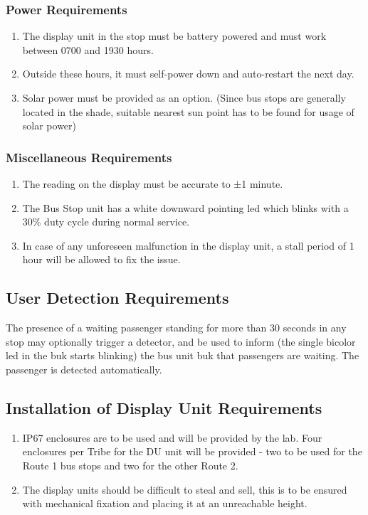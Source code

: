 \documentclass[12pt]{article} %
\begin{document}
    \subsubsection{Power Requirements}
    \begin{enumerate}
        \item The display unit in the stop must be battery powered and must work between 0700 and 1930 hours. 
        \item Outside these hours, it must self-power down and auto-restart the next day. 
        \item Solar power must be provided as an option. (Since bus stops are generally located in the shade, suitable nearest sun point has to be found for usage of solar power)
    \end{enumerate}
    \subsubsection{Miscellaneous Requirements}
    \begin{enumerate}
        \item The reading on the display must be accurate to ±1 minute. 
        \item The Bus Stop unit has a white downward pointing \acrshort{led} which blinks with a 30\% duty cycle during normal service. 
        \item In case of any unforeseen malfunction in the display unit, a stall period of 1 hour will be allowed to fix the issue. 
    \end{enumerate}
    
\subsection{User Detection Requirements}
        The presence of a waiting passenger standing for more than 30 seconds in any stop may optionally trigger a detector, and be used to inform (the single bicolor \acrshort{led} in the {\acrshort{buk}} starts blinking) the bus unit \acrshort{buk} that passengers are waiting. The passenger is detected automatically. 
        
\subsection{Installation of Display Unit Requirements}
\begin{enumerate}
    \item \gls{IP67} enclosures are to be used and will be provided by the lab. Four enclosures per Tribe for the DU unit will be provided - two to be used for the Route 1 bus stops and two for the other Route 2.
    \item The display units should be difficult to steal and sell, this is to be ensured with mechanical fixation and placing it at an unreachable height.
\end{enumerate}
\end{document}
